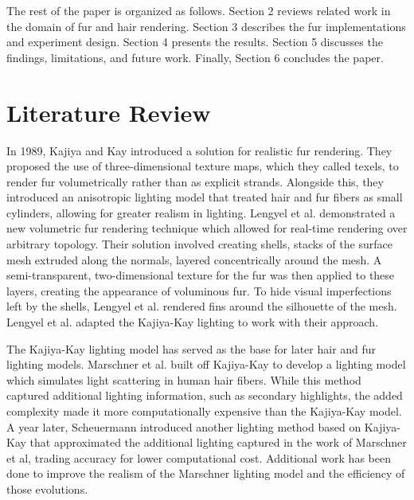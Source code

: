 \documentclass{article}
\begin{document}
The rest of the paper is organized as follows. Section 2 reviews related work in the domain of fur and hair rendering. Section 3 describes the fur implementations and experiment design. Section 4 presents the results. Section 5 discusses the findings, limitations, and future work. Finally, Section 6 concludes the paper.

\section{Literature Review}

In 1989, Kajiya and Kay introduced a solution for realistic fur rendering\cite{kajiya}. They proposed the use of three-dimensional texture maps, which they called texels, to render fur volumetrically rather than as explicit strands. Alongside this, they introduced an anisotropic lighting model that treated hair and fur fibers as small cylinders, allowing for greater realism in lighting. Lengyel et al. demonstrated a new volumetric fur rendering technique which allowed for real-time rendering over arbitrary topology\cite{lengyel}. Their solution involved creating shells, stacks of the surface mesh extruded along the normals, layered concentrically around the mesh. A semi-transparent, two-dimensional texture for the fur was then applied to these layers, creating the appearance of voluminous fur. To hide visual imperfections left by the shells, Lengyel et al. rendered fins around the silhouette of the mesh. Lengyel et al. adapted the Kajiya-Kay lighting to work with their approach\cite{lengyel}.

The Kajiya-Kay lighting model has served as the base for later hair and fur lighting models. Marschner et al. built off Kajiya-Kay to develop a lighting model which simulates light scattering in human hair fibers\cite{marschner}. While this method captured additional lighting information, such as secondary highlights, the added complexity made it more computationally expensive than the Kajiya-Kay model. A year later, Scheuermann introduced another lighting method based on Kajiya-Kay that approximated the additional lighting captured in the work of Marschner et al\cite{scheuermann}, trading accuracy for lower computational cost. Additional work has been done to improve the realism of the Marschner lighting model and the efficiency of those evolutions\cite{chiang, deon}.
\end{document}
